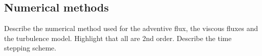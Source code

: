 
\subsection*{Numerical methods}
Describe the numerical method used for the adventive flux, the viscous fluxes and the turbulence model. Highlight that all are 2nd order. Describe the time stepping scheme.